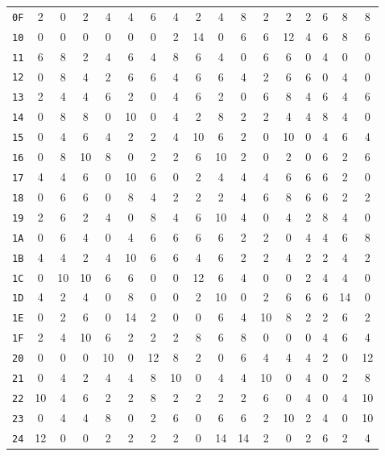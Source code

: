 \documentclass[12pt,a4paper]{article}
\begin{document}
\begin{center}
\begin{small}
\begin{longtable}{c|cccccccccccccccc}
\texttt{0F} & 2 & 0 & 2 & 4 & 4 & 6 & 4 & 2 & 4 & 8 & 2 & 2 & 2 & 6 & 8 & 8 \\
\texttt{10} & 0 & 0 & 0 & 0 & 0 & 0 & 2 & 14 & 0 & 6 & 6 & 12 & 4 & 6 & 8 & 6 \\
\texttt{11} & 6 & 8 & 2 & 4 & 6 & 4 & 8 & 6 & 4 & 0 & 6 & 6 & 0 & 4 & 0 & 0 \\
\texttt{12} & 0 & 8 & 4 & 2 & 6 & 6 & 4 & 6 & 6 & 4 & 2 & 6 & 6 & 0 & 4 & 0 \\
\texttt{13} & 2 & 4 & 4 & 6 & 2 & 0 & 4 & 6 & 2 & 0 & 6 & 8 & 4 & 6 & 4 & 6 \\
\texttt{14} & 0 & 8 & 8 & 0 & 10 & 0 & 4 & 2 & 8 & 2 & 2 & 4 & 4 & 8 & 4 & 0 \\
\texttt{15} & 0 & 4 & 6 & 4 & 2 & 2 & 4 & 10 & 6 & 2 & 0 & 10 & 0 & 4 & 6 & 4 \\
\texttt{16} & 0 & 8 & 10 & 8 & 0 & 2 & 2 & 6 & 10 & 2 & 0 & 2 & 0 & 6 & 2 & 6 \\
\texttt{17} & 4 & 4 & 6 & 0 & 10 & 6 & 0 & 2 & 4 & 4 & 4 & 6 & 6 & 6 & 2 & 0 \\
\texttt{18} & 0 & 6 & 6 & 0 & 8 & 4 & 2 & 2 & 2 & 4 & 6 & 8 & 6 & 6 & 2 & 2 \\
\texttt{19} & 2 & 6 & 2 & 4 & 0 & 8 & 4 & 6 & 10 & 4 & 0 & 4 & 2 & 8 & 4 & 0 \\
\texttt{1A} & 0 & 6 & 4 & 0 & 4 & 6 & 6 & 6 & 6 & 2 & 2 & 0 & 4 & 4 & 6 & 8 \\
\texttt{1B} & 4 & 4 & 2 & 4 & 10 & 6 & 6 & 4 & 6 & 2 & 2 & 4 & 2 & 2 & 4 & 2 \\
\texttt{1C} & 0 & 10 & 10 & 6 & 6 & 0 & 0 & 12 & 6 & 4 & 0 & 0 & 2 & 4 & 4 & 0 \\
\texttt{1D} & 4 & 2 & 4 & 0 & 8 & 0 & 0 & 2 & 10 & 0 & 2 & 6 & 6 & 6 & 14 & 0 \\
\texttt{1E} & 0 & 2 & 6 & 0 & 14 & 2 & 0 & 0 & 6 & 4 & 10 & 8 & 2 & 2 & 6 & 2 \\
\texttt{1F} & 2 & 4 & 10 & 6 & 2 & 2 & 2 & 8 & 6 & 8 & 0 & 0 & 0 & 4 & 6 & 4 \\
\texttt{20} & 0 & 0 & 0 & 10 & 0 & 12 & 8 & 2 & 0 & 6 & 4 & 4 & 4 & 2 & 0 & 12 \\
\texttt{21} & 0 & 4 & 2 & 4 & 4 & 8 & 10 & 0 & 4 & 4 & 10 & 0 & 4 & 0 & 2 & 8 \\
\texttt{22} & 10 & 4 & 6 & 2 & 2 & 8 & 2 & 2 & 2 & 2 & 6 & 0 & 4 & 0 & 4 & 10 \\
\texttt{23} & 0 & 4 & 4 & 8 & 0 & 2 & 6 & 0 & 6 & 6 & 2 & 10 & 2 & 4 & 0 & 10 \\
\texttt{24} & 12 & 0 & 0 & 2 & 2 & 2 & 2 & 0 & 14 & 14 & 2 & 0 & 2 & 6 & 2 & 4 \\

\end{longtable}
\end{small}
\end{center}
\end{document}
